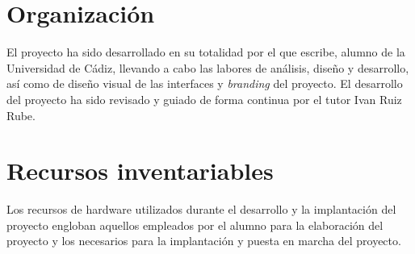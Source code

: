 \section{Organización}

El proyecto ha sido desarrollado en su totalidad por el que escribe, alumno de
la Universidad de Cádiz, llevando a cabo las labores de análisis, diseño y
desarrollo, así como de diseño visual de las interfaces y \textit{branding} del
proyecto. El desarrollo del proyecto ha sido revisado y guiado de forma continua por el
tutor Ivan Ruiz Rube.

\section{Recursos inventariables}

Los recursos de hardware utilizados durante el desarrollo y la implantación del
proyecto engloban aquellos empleados por el alumno para la elaboración del
proyecto y los necesarios para la implantación y puesta en marcha del proyecto.

